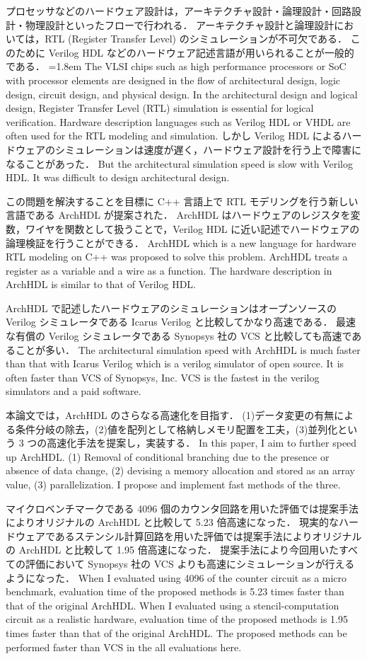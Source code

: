 プロセッサなどのハードウェア設計は，アーキテクチャ設計・論理設計・回路設計・物理設計といったフローで行われる．
アーキテクチャ設計と論理設計においては，RTL (Register Transfer Level) のシミュレーションが不可欠である．
このために Verilog HDL などのハードウェア記述言語が用いられることが一般的である．
\fi
\parindent=1.8em
The VLSI chips such as high performance processors or SoC with processor elements are designed in the flow of architectural design,
logic design, circuit design, and physical design.
In the architectural design and logical design, Register Transfer Level (RTL) simulation is essential for logical verification.
Hardware description languages such as Verilog HDL or VHDL are often used for the RTL modeling and simulation.
しかし Verilog HDL によるハードウェアのシミュレーションは速度が遅く，ハードウェア設計を行う上で障害になることがあった．
\fi
But the architectural simulation speed is slow with Verilog HDL. It was difficult to design architectural design.

この問題を解決することを目標に C++ 言語上で RTL モデリングを行う新しい言語である ArchHDL が提案された．
ArchHDL はハードウェアのレジスタを変数，ワイヤを関数として扱うことで，Verilog HDL に近い記述でハードウェアの論理検証を行うことができる．
\fi
ArchHDL which is a new language for hardware RTL modeling on C++ was proposed to solve this problem.
ArchHDL treats a register as a variable and a wire as a function.
The hardware description in ArchHDL is similar to that of Verilog HDL.

ArchHDL で記述したハードウェアのシミュレーションはオープンソースの Verilog シミュレータである Icarus Verilog と比較してかなり高速である．
最速な有償の Verilog シミュレータである Synopsys 社の VCS と比較しても高速であることが多い．
\fi
The architectural simulation speed with ArchHDL is much faster than
that with Icarus Verilog which is a verilog simulator of open source.
It is often faster than VCS of Synopsys, Inc.
VCS is the fastest in the verilog simulators and a paid software.

本論文では，ArchHDL のさらなる高速化を目指す．
(1)データ変更の有無による条件分岐の除去，(2)値を配列として格納しメモリ配置を工夫，(3)並列化という 3 つの高速化手法を提案し，実装する．
\fi
In this paper, I aim to further speed up ArchHDL.
(1) Removal of conditional branching due to the presence or absence of data change,
(2) devising a memory allocation and stored as an array value,
(3) parallelization.
I propose and implement fast methods of the three.

マイクロベンチマークである 4096 個のカウンタ回路を用いた評価では提案手法によりオリジナルの ArchHDL と比較して 5.23 倍高速になった．
現実的なハードウェアであるステンシル計算回路を用いた評価では提案手法によりオリジナルの ArchHDL と比較して 1.95 倍高速になった．
提案手法により今回用いたすべての評価において Synopsys 社の VCS よりも高速にシミュレーションが行えるようになった．
\fi
When I evaluated using 4096 of the counter circuit as a micro benchmark,
evaluation time of the proposed methods is 5.23 times faster than that of the original ArchHDL.
When I evaluated using a stencil-computation circuit as a realistic hardware,
evaluation time of the proposed methods is 1.95 times faster than that of the original ArchHDL.
The proposed methods can be performed faster than VCS in the all evaluations here.
